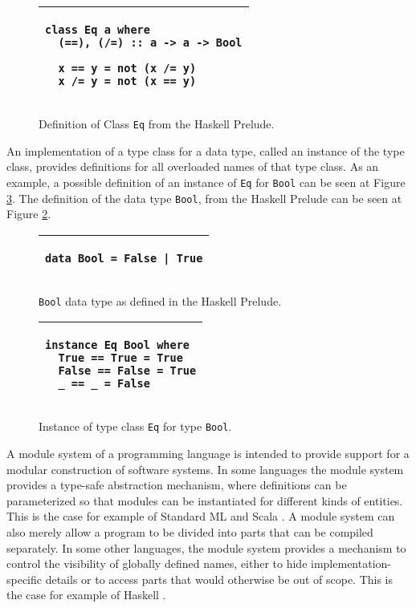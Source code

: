 \documentclass[msc]{ppgccufmg}
\begin{document}
\begin{figure}
\caption{Definition of Class \texttt{Eq} from the Haskell Prelude.\label{Eq}}
\begin{tabular}{|p{\textwidth}|}
\hline
\begin{verbatim}
class Eq a where
  (==), (/=) :: a -> a -> Bool

  x == y = not (x /= y)
  x /= y = not (x == y)
\end{verbatim}
\\
\hline
\end{tabular}
\end{figure}

An implementation of a type class for a data type, called an instance of the type class, provides definitions for all overloaded names of that type class.
As an example, a possible definition of an instance of \texttt{Eq} for \texttt{Bool} can be seen at Figure \ref{EqBool}.
The definition of the data type \texttt{Bool}, from the Haskell Prelude \citep{report} can be seen at Figure \ref{Bool}.

\begin{figure}
\caption{\texttt{Bool} data type as defined in the Haskell Prelude.\label{Bool}}
\begin{tabular}{|p{\textwidth}|}
\hline
\begin{verbatim}
data Bool = False | True
\end{verbatim}
\\
\hline
\end{tabular}
\end{figure}

\begin{figure}
\caption{Instance of type class \texttt{Eq} for type \texttt{Bool}.\label{EqBool}}
\begin{tabular}{|p{\textwidth}|}
\hline
\begin{verbatim}
instance Eq Bool where
  True == True = True
  False == False = True
  _ == _ = False
\end{verbatim}
\\
\hline
\end{tabular}
\end{figure}

A module system of a programming language is intended to provide
support for a modular construction of software systems.  In some
languages the module system provides a type-safe abstraction
mechanism, where definitions can be parameterized so that
modules can be instantiated for different kinds of
entities. This is the case for example of Standard ML \citep{sml} and
Scala \citep{scala}. A module system can also merely allow a program to
be divided into parts that can be compiled separately. In some other
languages, the module system provides a mechanism to control the
visibility of globally defined names, either to hide
implementation-specific details or to access parts that would
otherwise be out of scope. This is the case for example of Haskell
\citep[chapter~5]{report}.
\end{document}

